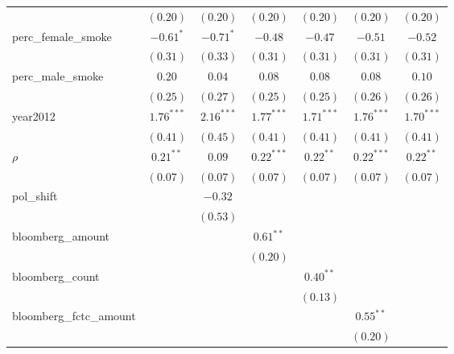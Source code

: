 \begin{table}[!h]
\begin{center}
\begin{tabular}{l c c c c c c }
                        & $(0.20)$     & $(0.20)$     & $(0.20)$     & $(0.20)$     & $(0.20)$     & $(0.20)$     \\
perc\_female\_smoke     & $-0.61^{*}$  & $-0.71^{*}$  & $-0.48$      & $-0.47$      & $-0.51$      & $-0.52$      \\
                        & $(0.31)$     & $(0.33)$     & $(0.31)$     & $(0.31)$     & $(0.31)$     & $(0.31)$     \\
perc\_male\_smoke       & $0.20$       & $0.04$       & $0.08$       & $0.08$       & $0.08$       & $0.10$       \\
                        & $(0.25)$     & $(0.27)$     & $(0.25)$     & $(0.25)$     & $(0.26)$     & $(0.26)$     \\
year2012                & $1.76^{***}$ & $2.16^{***}$ & $1.77^{***}$ & $1.71^{***}$ & $1.76^{***}$ & $1.70^{***}$ \\
                        & $(0.41)$     & $(0.45)$     & $(0.41)$     & $(0.41)$     & $(0.41)$     & $(0.41)$     \\
$\rho$                  & $0.21^{**}$  & $0.09$       & $0.22^{***}$ & $0.22^{**}$  & $0.22^{***}$ & $0.22^{**}$  \\
                        & $(0.07)$     & $(0.07)$     & $(0.07)$     & $(0.07)$     & $(0.07)$     & $(0.07)$     \\
pol\_shift              &              & $-0.32$      &              &              &              &              \\
                        &              & $(0.53)$     &              &              &              &              \\
bloomberg\_amount       &              &              & $0.61^{**}$  &              &              &              \\
                        &              &              & $(0.20)$     &              &              &              \\
bloomberg\_count        &              &              &              & $0.40^{**}$  &              &              \\
                        &              &              &              & $(0.13)$     &              &              \\
bloomberg\_fctc\_amount &              &              &              &              & $0.55^{**}$  &              \\
                        &              &              &              &              & $(0.20)$     &              \\

\end{tabular}
\end{center}
\end{table}
